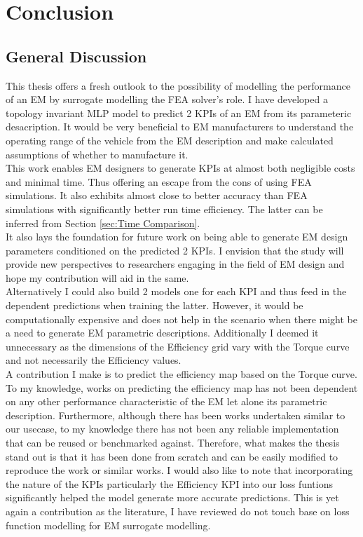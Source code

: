 \documentclass{report} %
\begin{document}
\chapter{Conclusion}

\section{General Discussion}\label{sec:General Discussion}
This thesis offers a fresh outlook to the possibility of modelling the performance of an \ac{EM} by surrogate modelling the \ac{FEA} solver's role.
I have developed a topology invariant \ac{MLP} model to predict 2 \ac{KPI}s of an \ac{EM} from its parameteric desacription. 
It would be very beneficial to \ac{EM} manufacturers to understand the operating range of the vehicle from the \ac{EM} description and make calculated assumptions of 
whether to manufacture it.\\
This work enables \ac{EM} designers to generate \ac{KPI}s at almost both negligible costs and minimal time.
Thus offering an escape from the cons of using \ac{FEA} simulations. It also exhibits almost close to better accuracy than \ac{FEA} simulations with significantly 
better run time efficiency. The latter can be inferred from Section \ref{sec:Time Comparison}.\\

It also lays the foundation for future work on being able to generate \ac{EM} design parameters conditioned on the predicted 2 KPIs.
I envision that the study will provide new perspectives to researchers engaging in the field of \ac{EM} design and hope my contribution will aid in the same.\\
Alternatively I could also build 2 models one for each \ac{KPI} and thus feed in the dependent predictions when training the latter. 
However, it would be computationally expensive and does not help in the scenario when there might be a need to generate \ac{EM} parametric descriptions.
Additionally I deemed it unnecessary as the dimensions of the Efficiency grid vary with the Torque curve and not necessarily the Efficiency values. \\

A contribution I make is to predict the efficiency map based on the Torque curve. To my knowledge, works on predicting the efficiency map has not 
been dependent on any other performance characteristic of the \ac{EM} let alone its parametric description. Furthermore, although there has been works undertaken similar 
to our usecase, to my knowledge there has not been any reliable implementation that can be reused or benchmarked against. Therefore, what makes the thesis stand out is 
that it has been done from scratch and can be easily modified to reproduce the work or similar works.
I would also like to note that incorporating the nature of the \ac{KPI}s particularly the Efficiency \ac{KPI} into our loss funtions significantly helped the model generate 
more accurate predictions. This is yet again a contribution as the literature, I have reviewed do not touch base on loss function modelling for \ac{EM} surrogate modelling.\\
\end{document}
